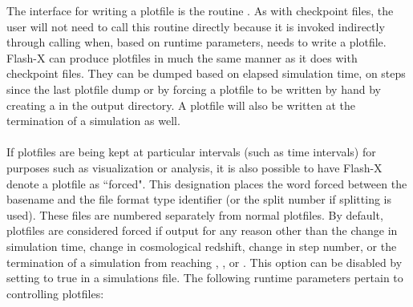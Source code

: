The interface for writing a plotfile is the routine
.  As with
checkpoint files, the user will not need to call this routine directly
because it is invoked indirectly through calling
 when, based on runtime parameters, 
\flashx needs to write a plotfile.  Flash-X can produce plotfiles in much the same
manner as it does with checkpoint files.  They can be dumped based on
elapsed simulation time, on steps since the last plotfile dump or by
forcing a plotfile to be written by hand by creating a
in the output
directory.  %
A plotfile will also be written at the termination of a simulation
as well.\\
\\
If plotfiles are being kept at particular intervals (such as time
intervals) for purposes such as visualization or analysis, it is also
possible to have Flash-X denote a plotfile as ``forced".  This designation places the
word forced between the basename and the file format type identifier
(or the split number if splitting is used).  These files are numbered
separately from normal plotfiles.  By default, plotfiles are
considered forced if output for any reason other than the change in
simulation time, change in cosmological redshift, change in step
number, or the termination of a simulation from reaching  ,
, or .  This option can be disabled by setting
 to true in a simulations 
file. The following runtime parameters pertain to controlling
plotfiles:


